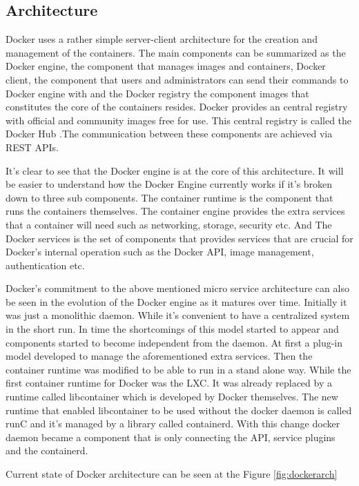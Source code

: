 \documentclass[12pt,oneandhalf,chaparabic,ceng,ms,eng,oneside,pntc]{gsufbe}
\begin{document}
\subsection{Architecture}
Docker uses a rather simple server-client architecture for the creation and management of the
containers.  The main components can be summarized as the Docker engine, the component that manages
images and containers, Docker client, the component that users and administrators can send their
commands to Docker engine with and the Docker registry the component images that constitutes the core of
the containers resides.  Docker provides an central registry with official and community images free for
use.  This central registry is called the Docker Hub \cite{docker_hub}
.The communication between these components are achieved via REST APIs.

It's clear to see that the Docker engine is at the core of this architecture.  It will be easier to
understand how the Docker Engine currently works if it's broken down to three sub components.  The
container runtime is the component that runs the containers themselves.  The container engine provides
the extra services that a container will need such as networking, storage, security etc.  And The Docker 
services is the set of components that provides services that are crucial for Docker's internal
operation such as the Docker API, image management, authentication etc.

Docker's commitment to the above mentioned micro service architecture can also be seen in the evolution
of the Docker engine as it matures over time.  Initially it was just a monolithic daemon.  While it's
convenient to have a centralized system in the short run.  In time the shortcomings of this model
started to appear and components started to become independent from the daemon.  At first a plug-in
model developed to manage the aforementioned extra services.  Then the container runtime was modified to
be able to run in a stand alone way.  While the first container runtime for Docker was the LXC.  It was
already replaced by a runtime called libcontainer which is developed by Docker themselves.  The new
runtime that enabled libcontainer to be used without the docker daemon is called runC and it's managed
by a library called containerd.  With this change docker daemon became a component that is only
connecting the API, service plugins and the containerd.

Current state of Docker architecture can be seen at the Figure \ref{fig:dockerarch}
\end{document}
